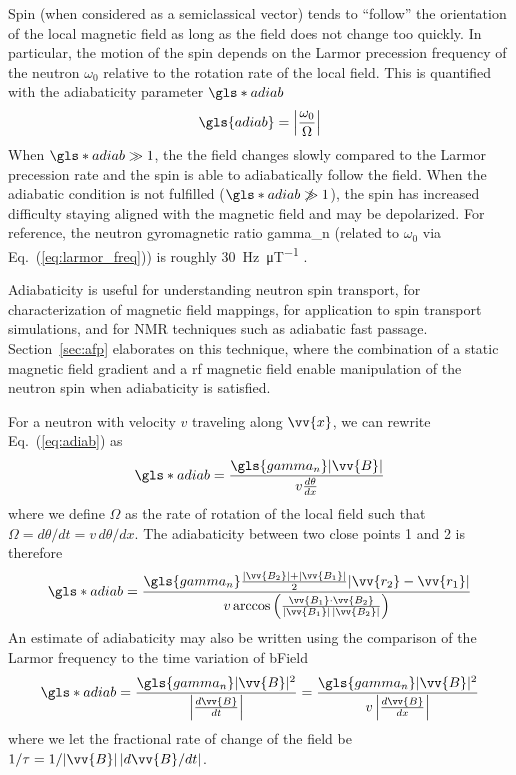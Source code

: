 
Spin (when considered as a semiclassical vector) tends to ``follow'' the orientation of the local magnetic field as long as the field does not change too quickly. In particular, the motion of the spin depends on the Larmor precession frequency of the neutron $\omega_0$ relative to the rotation rate of the local field. This is quantified with the adiabaticity parameter $\gls*{adiab}$ \cite{abragam1961principles}
%
\begin{gather}
    \gls{adiab}=\left| \frac{\omega_0}{\Omega} \right| \label{eq:adiab}
\end{gather}
%
When $\gls*{adiab}\gg 1$, the the field changes slowly compared to the Larmor precession rate and the spin is able to adiabatically follow the field. When the adiabatic condition is not fulfilled ($\gls*{adiab}\not\gg 1$), the spin has increased difficulty staying aligned with the magnetic field and may be depolarized. For reference, the neutron gyromagnetic ratio \gls{gamma_n} (related to $\omega_0$ via Eq.~(\ref{eq:larmor_freq})) is roughly \qty{30}{\hertz.\micro\tesla^{-1}} \cite{codata_2018}.

Adiabaticity is useful for understanding neutron spin transport, for characterization of magnetic field mappings, for application to spin transport simulations, and for NMR techniques such as adiabatic fast passage. Section~\ref{sec:afp} elaborates on this technique, where the combination of a static magnetic field gradient and a \acrshort{rf} magnetic field enable manipulation of the neutron spin when adiabaticity is satisfied. 

For a neutron with velocity $v$ traveling along $\vv{x}$, we can rewrite Eq.~(\ref{eq:adiab}) as
%
\begin{gather}
    \gls*{adiab}=\frac{ \gls{gamma_n}| \vv{B} |}{v\frac{d\theta}{dx}}
\end{gather}
%
where we define $\Omega$ as the rate of rotation of the local field such that $\Omega=d\theta/dt=v\,d\theta/dx$. The adiabaticity between two close points 1 and 2 is therefore
%
\begin{gather}
    \gls*{adiab}=\frac{\gls{gamma_n} \frac{ | \vv{B_2} | +| \vv{B_1}| }{2} | \vv{r_2} - \vv{r_1}|}
    {v\arccos \left( \frac{\vv{B_1}\cdot\vv{B_2}}{| \vv{B_1} | \, \vert \vv{B_2} | }\right)}
\end{gather}
%
An estimate of adiabaticity may also be written using the comparison of the Larmor frequency to the time variation of \gls*{bField}
%
\begin{gather}
    \gls*{adiab}=\frac{\gls{gamma_n}| \vv{B} | ^2}{\left| \frac{d\vv{B}}{dt} \right|}
    =\frac{\gls{gamma_n}| \vv{B} | ^2}{v\left| \frac{d\vv{B}}{dx} \right|}
\end{gather}
%
where we let the fractional rate of change of the field be $1/\tau = 1/ |\vv{B}|\,|d\vv{B}/dt|$.

